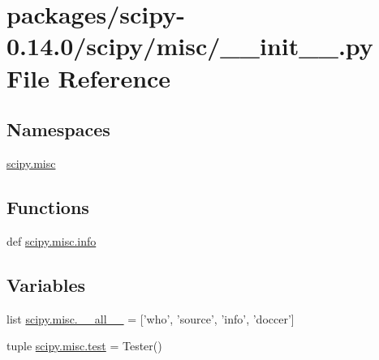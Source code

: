 \hypertarget{packages_2scipy-0_814_80_2scipy_2misc_2____init_____8py}{}\section{packages/scipy-\/0.14.0/scipy/misc/\+\_\+\+\_\+init\+\_\+\+\_\+.py File Reference}
\label{packages_2scipy-0_814_80_2scipy_2misc_2____init_____8py}
\subsection*{Namespaces}
\begin{DoxyCompactItemize}
\item 
 \hyperlink{namespacescipy_1_1misc}{scipy.\+misc}
\end{DoxyCompactItemize}
\subsection*{Functions}
\begin{DoxyCompactItemize}
\item 
def \hyperlink{namespacescipy_1_1misc_a9df72954626c50a4d50324a3497a8b95}{scipy.\+misc.\+info}
\end{DoxyCompactItemize}
\subsection*{Variables}
\begin{DoxyCompactItemize}
\item 
list \hyperlink{namespacescipy_1_1misc_a6aecc429c8e40542d00cf5677ae15521}{scipy.\+misc.\+\_\+\+\_\+all\+\_\+\+\_\+} = \mbox{[}'who', 'source', 'info', 'doccer'\mbox{]}
\item 
tuple \hyperlink{namespacescipy_1_1misc_a21545251e17588983d91eb63e3b9d306}{scipy.\+misc.\+test} = Tester()
\end{DoxyCompactItemize}

